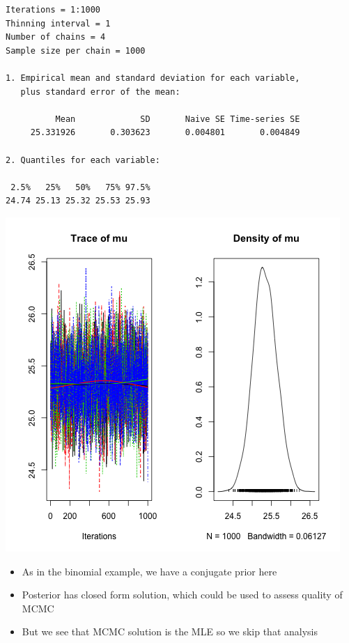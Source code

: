 \documentclass{beamer}
\begin{document}
\begin{frame}[fragile]
  \begin{verbatim}
Iterations = 1:1000
Thinning interval = 1 
Number of chains = 4 
Sample size per chain = 1000 

1. Empirical mean and standard deviation for each variable,
   plus standard error of the mean:

          Mean             SD       Naive SE Time-series SE 
     25.331926       0.303623       0.004801       0.004849 

2. Quantiles for each variable:

 2.5%   25%   50%   75% 97.5% 
24.74 25.13 25.32 25.53 25.93 
  \end{verbatim}
\end{frame}

\begin{frame}[fragile]
  \begin{center}
    \includegraphics[scale = 0.4]{../graphs/normal/plot1.png}
  \end{center}
\end{frame}

\begin{frame}[fragile]
  \begin{itemize}
    \item{As in the binomial example, we have a conjugate prior here}
    \item{Posterior has closed form solution, which could be used to assess quality of MCMC}
    \item{But we see that MCMC solution is the MLE so we skip that analysis}
  \end{itemize}
\end{frame}
\end{document}
